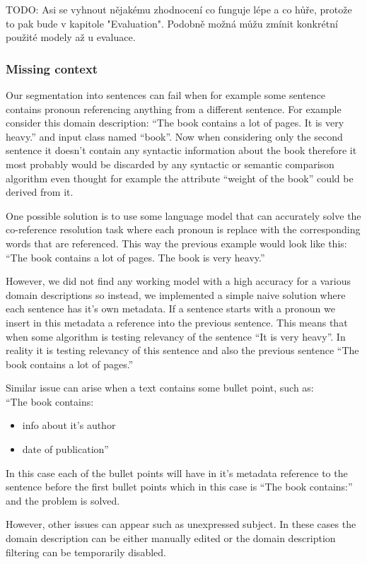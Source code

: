 TODO: Asi se vyhnout nějakému zhodnocení co funguje lépe a co hůře, protože to pak bude v kapitole "Evaluation". Podobně možná můžu zmínit konkrétní použité modely až u evaluace. \\


\subsubsection{Missing context}

Our segmentation into sentences can fail when for example some sentence contains pronoun referencing anything from a different sentence. For example consider this domain description: ``The book contains a lot of pages. It is very heavy.'' and input class named ``book''. Now when considering only the second sentence it doesn't contain any syntactic information about the book therefore it most probably would be discarded by any syntactic or semantic comparison algorithm even thought for example the attribute ``weight of the book'' could be derived from it.

One possible solution is to use some language model that can accurately solve the co-reference resolution task where each pronoun is replace with the corresponding words that are referenced. This way the previous example would look like this: ``The book contains a lot of pages. The book is very heavy.''

However, we did not find any working model with a high accuracy for a various domain descriptions so instead, we implemented a simple naive solution where each sentence has it's own metadata. If a sentence starts with a pronoun we insert in this metadata a reference into the previous sentence. This means that when some algorithm is testing relevancy of the sentence ``It is very heavy''. In reality it is testing relevancy of this sentence and also the previous sentence ``The book contains a lot of pages.''

Similar issue can arise when a text contains some bullet point, such as: \\

``The book contains:
\begin{itemize}
\item info about it's author
\item date of publication''
\end{itemize}

In this case each of the bullet points will have in it's metadata reference to the sentence before the first bullet points which in this case is ``The book contains:'' and the problem is solved.

However, other issues can appear such as unexpressed subject. In these cases the domain description can be either manually edited or the domain description filtering can be temporarily disabled.